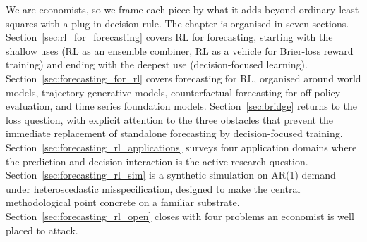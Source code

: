We are economists, so we frame each piece by what it adds beyond ordinary least
squares with a plug-in decision rule. The chapter is organised in seven sections.
Section~\ref{sec:rl_for_forecasting} covers RL for forecasting, starting with the
shallow uses (RL as an ensemble combiner, RL as a vehicle for Brier-loss reward
training) and ending with the deepest use (decision-focused learning).
Section~\ref{sec:forecasting_for_rl} covers forecasting for RL, organised around
world models, trajectory generative models, counterfactual forecasting for
off-policy evaluation, and time series foundation models.
Section~\ref{sec:bridge} returns to the loss question, with explicit attention to
the three obstacles that prevent the immediate replacement of standalone forecasting
by decision-focused training. Section~\ref{sec:forecasting_rl_applications} surveys
four application domains where the prediction-and-decision interaction is the active
research question. Section~\ref{sec:forecasting_rl_sim} is a synthetic simulation on
AR(1) demand under heteroscedastic misspecification, designed to make the central
methodological point concrete on a familiar substrate. Section~\ref{sec:forecasting_rl_open}
closes with four problems an economist is well placed to attack.
